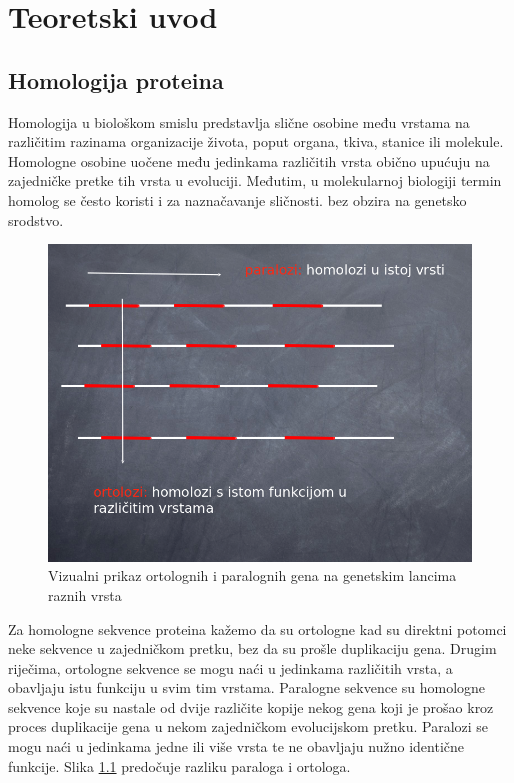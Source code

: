 \chapter{Teoretski uvod}
\label{chap:teoretski-uvod}

\section{Homologija proteina}
\label{sec:homologija}

Homologija u biološkom smislu predstavlja slične osobine među vrstama na
različitim razinama organizacije života, poput organa, tkiva, stanice ili
molekule. Homologne osobine uočene među jedinkama različitih vrsta obično
upućuju na zajedničke pretke tih vrsta u evoluciji. Međutim, u molekularnoj
biologiji termin homolog se često koristi i za naznačavanje sličnosti. bez
obzira na genetsko srodstvo.\cite{bioinfo1}

\begin{figure}[h!]
\centering
\includegraphics[width=4.5in]{figures/ortho-para.png}
\caption{Vizualni prikaz ortolognih i paralognih gena na genetskim lancima
raznih vrsta}
\label{fig:para-ortho}
\end{figure}

Za homologne sekvence proteina kažemo da su ortologne kad su direktni
potomci neke sekvence u zajedničkom pretku, bez da su prošle duplikaciju
gena. Drugim riječima, ortologne sekvence se mogu naći u jedinkama
različitih vrsta, a obavljaju istu funkciju u svim tim vrstama. Paralogne
sekvence su homologne sekvence koje su nastale od dvije različite kopije
nekog gena koji je prošao kroz proces duplikacije gena u nekom zajedničkom
evolucijskom pretku. Paralozi se mogu naći u jedinkama jedne ili više vrsta te
ne obavljaju nužno identične funkcije. Slika \ref{fig:para-ortho} predočuje
razliku paraloga i ortologa.



